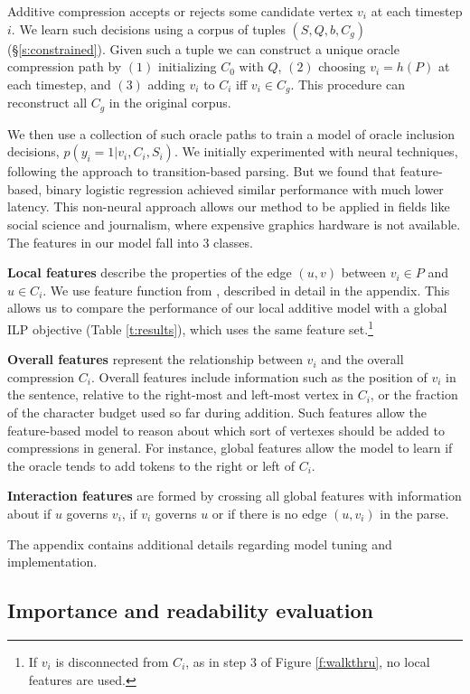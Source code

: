 \documentclass[11pt,a4paper]{article}
\begin{document}
Additive compression accepts or rejects some candidate vertex $v_i$ at each timestep $i$. 
We learn such decisions using a corpus of tuples $(S,Q,b,C_g)$ (\S\ref{s:constrained}). Given such a tuple we can construct a unique oracle compression path by $(1)$ initializing $C_0$ with $Q$, $(2)$ choosing $v_i = h(P)$ at each timestep, and $(3)$ adding $v_i$ to $C_i$ iff $v_i \in C_g$. This procedure can reconstruct all $C_g$ in the original \citet{filippova2013overcoming} corpus. 

We then use a collection of such oracle paths to train a model of oracle inclusion decisions, ${p(y_i  = 1 | v_i, C_i, S_i)}$. We initially experimented with neural techniques, following the \citet{D14-1082} approach to transition-based parsing. But we found that feature-based, binary logistic regression achieved similar performance with much lower latency. This non-neural approach allows our method to be applied in fields like social science and journalism, where expensive graphics hardware is not available. The features in our model fall into 3 classes.

\textbf{Local features} describe the properties of the edge $(u,v)$ between $v_i \in P$ and $u \in C_i$. We use feature function from \citet{filippova2013overcoming}, described in detail in the appendix. This allows us to compare the performance of our local additive model with a global ILP objective (Table \ref{t:results}), which uses the same feature set.\footnote{If $v_i$ is disconnected from $C_i$, as in step 3 of Figure \ref{f:walkthru}, no local features are used.}

\textbf{Overall features} represent the relationship between $v_i$ and the overall compression $C_i$. Overall features include information such as the position of $v_i$ in the sentence, relative to the right-most and left-most vertex in $C_i$, or the fraction of the character budget used so far during addition. Such  features allow the feature-based model to reason about which sort of vertexes should be added to compressions in general. For instance, global features allow the model to learn if the oracle tends to add tokens to the right or left of $C_i$.

\textbf{Interaction features} are formed by crossing all global features with information about if $u$ governs $v_i$, if $v_i$ governs $u$ or if there is no edge $(u,v_i)$ in the parse.

The appendix contains additional details regarding model tuning and implementation. 

\subsection{Importance and readability evaluation}\label{s:readabilityinformativeness}
\end{document}
